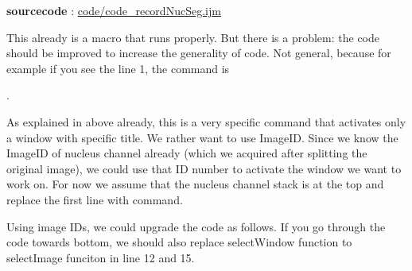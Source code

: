 \textbf{sourcecode} : \href{http://www.example.com/contents}{code/code\_recordNucSeg.ijm}

This already is a macro that runs properly. But there is a problem: the code should be improved to increase the generality of code. Not general, because for example if you see the line 1, the command is

.

As explained in above already, this is a very specific command that activates only a window with specific title. We rather want to use ImageID. Since we know the ImageID of nucleus channel already (which we acquired after splitting the original image), we could use that ID number to activate the window we want to work on. For now we assume that the nucleus channel stack is at the top and replace the first line with  command.

Using image IDs, we could upgrade the code as follows.  If you go through the code towards bottom, we should also replace selectWindow function to selectImage funciton in line 12 and 15.